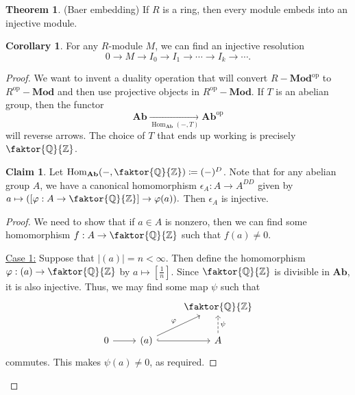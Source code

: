 \documentclass[10pt,letterpaper,cm]{nupset}
\theoremstyle{definition}
\newtheorem{claim}{Claim}
\newtheorem{theorem}{Theorem}
\newtheorem{corollary}{Corollary}
\newcommand{\Q}{\mathbb Q}
\newcommand{\Z}{\mathbb Z}
\newcommand{\1}{\mathbf{1}}
\newcommand{\0}{\vec 0}
\DeclareMathOperator{\op}{op}
\DeclareMathOperator{\Hom}{Hom}
\begin{document}
\begin{theorem}{(Baer embedding)}
If $R$ is a ring, then every module embeds into an injective module.
\begin{corollary}
For any $R$-module $M$, we can find an injective resolution $$ 0 \to M \to I_0 \to I_1 \to \cdots \to I_k \to \cdots  . $$
\end{corollary} 
\end{theorem}
\begin{proof}
We want to invent a duality operation that will convert $R {-} \mathbf{Mod}^{\op}$ to  $R^{\op} {-} \mathbf{Mod}$ and then use projective objects in $R^{\op}{-}\mathbf{Mod}$. If $T$ is an abelian group, then the functor $$ \mathbf{Ab}\underset{\Hom_{\mathbf{Ab}}(-, T)}{ \longrightarrow} \mathbf{Ab}^{\op}$$ will reverse arrows. The choice of $T$ that ends up working is precisely $\faktor{\Q}{\Z}$.
\begin{claim}
Let $\Hom_{\mathbf{Ab}}(-, \faktor{\Q}{\Z}) \coloneqq  (-)^D$. Note that for any abelian group $A$, we have a canonical homomorphism $\epsilon_A : A \to A^{DD}$ given by $a \mapsto ([\varphi :A \to \faktor{\Q}{\Z}] \to \varphi(a)).$ Then $\epsilon_A$ is injective.
\end{claim}
\begin{proof}
We need to show that if $a\in A$ is nonzero, then we can find some homomorphism $f: A \to \faktor{\Q}{\Z}$ such that $f(a) \ne 0$.

\underline{Case 1:} Suppose that $|(a)| = n< \infty$. Then define the homomorphism $\varphi : (a) \to \faktor{\Q}{\Z}$ by $a \mapsto [\frac{1}{n}]$. Since $\faktor{\Q}{\Z}$ is divisible in $\mathbf{Ab}$, it is also injective. Thus, we may find some map  $\psi$ such that 
\[
\begin{tikzcd}
 &  & \faktor{\Q}{\Z} \\
0 \arrow[r] & (a) \arrow[r, hook] \arrow[ru, "\varphi"] & A \arrow[u, "\psi"', dashed]
\end{tikzcd}
\] commutes. This makes $\psi(a) \ne 0$, as required.


\end{proof}
\end{proof}
\end{document}
